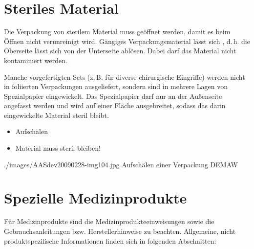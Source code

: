 \section{Steriles Material}

{
Die Verpackung von sterilem Material muss 
geöffnet werden, damit es beim Öffnen nicht verunreinigt
wird. Gängiges Verpackungsmaterial lässt sich
, d.\,h. die Oberseite lässt sich von der
Unterseite ablösen. Dabei darf das Material nicht
kontaminiert werden.

Manche vorgefertigten Sets (z.\,B. für diverse chirurgische
Eingriffe) werden nicht in foliierten Verpackungen
ausgeliefert, sondern sind in mehrere Lagen von Spezialpapier
eingewickelt. Das Spezialpapier darf nur an der Außenseite
angefasst werden und wird auf einer Fläche ausgebreitet,
sodass das darin eingewickelte Material steril bleibt.
}
{
\begin{itemize}
  \item Aufschälen
  \item Material muss steril bleiben!
\end{itemize}
}
{./images/AASdev20090228-img104.jpg}
{Aufschälen einer Verpackung}
{DEMAW}






\section{Spezielle Medizinprodukte}

Für Medizinprodukte sind die Medizinprodukteeinweisungen
sowie die Gebrauchsanleitungen bzw. Herstellerhinweise zu
beachten. Allgemeine, nicht produktspezifische Informationen
finden sich in folgenden Abschnitten:

